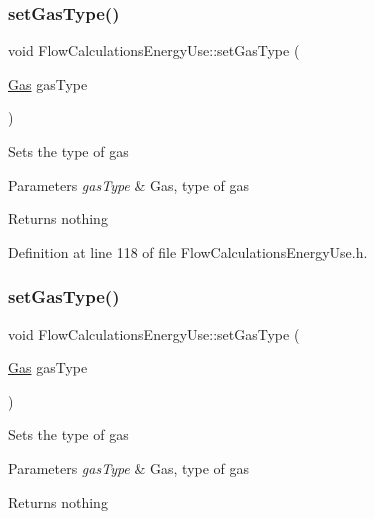\subsubsection{\texorpdfstring{set\+Gas\+Type()}{setGasType()}\hspace{0.1cm}{\footnotesize\ttfamily [1/3]}}
{\footnotesize\ttfamily void Flow\+Calculations\+Energy\+Use\+::set\+Gas\+Type (\begin{DoxyParamCaption}\item[{\hyperlink{class_flow_calculations_energy_use_a840d5a836e7b05d6791b79bace4440f2}{Gas}}]{gas\+Type }\end{DoxyParamCaption})\hspace{0.3cm}{\ttfamily [inline]}}

Sets the type of gas


\begin{DoxyParams}{Parameters}
{\em gas\+Type} & Gas, type of gas\\
\hline
\end{DoxyParams}
\begin{DoxyReturn}{Returns}
nothing 
\end{DoxyReturn}


Definition at line 118 of file Flow\+Calculations\+Energy\+Use.\+h.

\mbox{\label{class_flow_calculations_energy_use_a01b38762426c50e6ab22aefd674f30df}} 
\subsubsection{\texorpdfstring{set\+Gas\+Type()}{setGasType()}\hspace{0.1cm}{\footnotesize\ttfamily [2/3]}}
{\footnotesize\ttfamily void Flow\+Calculations\+Energy\+Use\+::set\+Gas\+Type (\begin{DoxyParamCaption}\item[{\hyperlink{class_flow_calculations_energy_use_a840d5a836e7b05d6791b79bace4440f2}{Gas}}]{gas\+Type }\end{DoxyParamCaption})\hspace{0.3cm}{\ttfamily [inline]}}

Sets the type of gas


\begin{DoxyParams}{Parameters}
{\em gas\+Type} & Gas, type of gas\\
\hline
\end{DoxyParams}
\begin{DoxyReturn}{Returns}
nothing 
\end{DoxyReturn}


